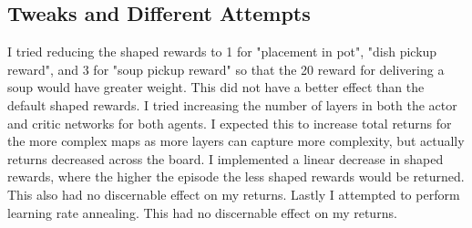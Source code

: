 \documentclass[conference]{IEEEtran}
\begin{document}
\subsection{Tweaks and Different Attempts}
I tried reducing the shaped rewards to 1 for "placement in pot", "dish pickup reward", and 3 for "soup pickup reward" so that the 20 reward
for delivering a soup would have greater weight. This did not have a better effect than the default shaped rewards. I tried increasing the number of layers
in both the actor and critic networks for both agents. I expected this to increase total returns for the more complex maps as more layers can
capture more complexity, but actually returns decreased across the board. I implemented a linear decrease in shaped rewards, where the higher the
episode the less shaped rewards would be returned. This also had no discernable effect on my returns. Lastly I attempted to perform learning rate 
annealing. This had no discernable effect on my returns. 
\end{document}
